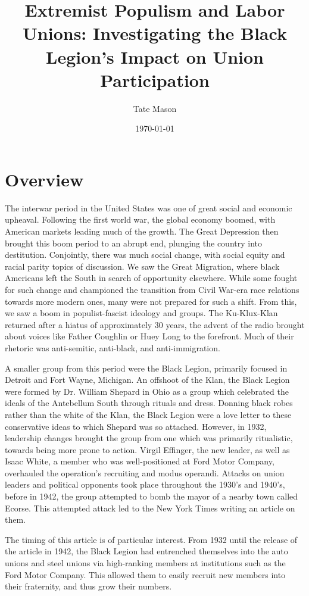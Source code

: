 \documentclass[11pt]{article}
\title{Extremist Populism and Labor Unions: Investigating the Black Legion's Impact on Union Participation
}
\author{Tate Mason}
\date{\today}
\theoremstyle{definition}
\theoremstyle{remark}
\begin{document}
\maketitle
\thispagestyle{empty}
\newpage

\section{Overview}

The interwar period in the United States was one of great social and economic upheaval. Following the first world war, the global economy boomed, with American markets leading much of the growth. The Great Depression then brought this boom period to an abrupt end, plunging the country into destitution. Conjointly, there was much social change, with social equity and racial parity topics of discussion. We saw the Great Migration, where black Americans left the South in search of opportunity elsewhere. While some fought for such change and championed the transition from Civil War-era race relations towards more modern ones, many were not prepared for such a shift. From this, we saw a boom in populist-fascist ideology  and groups. The Ku-Klux-Klan returned after a hiatus of approximately 30 years, the advent of the radio brought about voices like Father Coughlin or Huey Long to the forefront. Much of their rhetoric was anti-semitic, anti-black, and anti-immigration. 

A smaller group from this period were the Black Legion, primarily focused in Detroit and Fort Wayne, Michigan. An offshoot of the Klan, the Black Legion were formed by Dr. William Shepard in Ohio as a group which celebrated the ideals of the Antebellum South through rituals and dress. Donning black robes rather than the white of the Klan, the Black Legion were a love letter to these conservative ideas to which Shepard was so attached. However, in 1932, leadership changes brought the group from one which was primarily ritualistic, towards being more prone to action. Virgil Effinger, the new leader, as well as Isaac White, a member who was well-positioned at Ford Motor Company, overhauled the operation's recruiting and modus operandi. Attacks on union leaders and political opponents took place throughout the 1930's and 1940's, before in 1942, the group attempted to bomb the mayor of a nearby town called Ecorse. This attempted attack led to the New York Times writing an article on them. 

The timing of this article is of particular interest. From 1932 until the release of the article in 1942, the Black Legion had entrenched themselves into the auto unions and steel unions via high-ranking members at institutions such as the Ford Motor Company. This allowed them to easily recruit new members into their fraternity, and thus grow their numbers.
\end{document}
